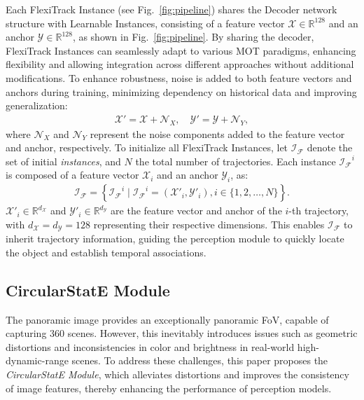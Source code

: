 %

Each FlexiTrack Instance (see Fig.~\ref{fig:pipeline}) shares the Decoder network structure with Learnable Instances, consisting of a feature vector \( \mathcal{X} {\in} \mathbb{R}^{128} \) and an anchor \( \mathcal{Y} {\in} \mathbb{R}^{128} \), as shown in Fig.~\ref{fig:pipeline}. 
By sharing the decoder, FlexiTrack Instances can seamlessly adapt to various MOT paradigms, enhancing flexibility and allowing integration across different approaches without additional modifications.
%
To enhance robustness, noise is added to both feature vectors and anchors during training, minimizing dependency on historical data and improving generalization:
\begin{align}
\mathcal{X}' = \mathcal{X} + \mathcal{N}_X, \quad \mathcal{Y}' = \mathcal{Y} + \mathcal{N}_Y, 
\end{align}
where \( \mathcal{N}_X \) and \( \mathcal{N}_Y \) represent the noise components added to the feature vector and anchor, respectively.
To initialize all FlexiTrack Instances, let \( \mathcal{I_F} \) denote the set of initial \emph{instances}, and \( N \) the total number of trajectories. 
Each instance \( \mathcal{I_F}^i \) is composed of a feature vector \( \mathcal{X}_i \) and an anchor \( \mathcal{Y}_i \), as:
\begin{align}
\mathcal{I_F} = \left\{  \mathcal{I_F} ^i \mid \mathcal{I_F}^i = (\mathcal{X}'_i, \mathcal{Y}'_i), i \in \{1, 2, \dots, N\} \right\}.
\end{align}
%
\( \mathcal{X}'_i {\in} \mathbb{R}^{d_{\mathcal{X}}} \) and \( \mathcal{Y}'_i {\in} \mathbb{R}^{d_{\mathcal{Y}}} \) are the feature vector and anchor of the \( i \)-th trajectory, 
%
with \( d_{\mathcal{X}} {=} d_{\mathcal{Y}} {=} 128 \) representing their respective dimensions.
This enables $\mathcal{I_F}$ to inherit trajectory information, guiding the perception module to quickly locate the object and establish temporal associations.

%


\subsection{CircularStatE Module} 
\label{subsec:CSEM}
%

The panoramic image provides an exceptionally panoramic FoV, capable of capturing 360{\textdegree} scenes. However, this inevitably introduces issues such as geometric distortions and inconsistencies in color and brightness in real-world high-dynamic-range scenes. To address these challenges, this paper proposes the \emph{CircularStatE Module}, which alleviates distortions and improves the consistency of image features, thereby enhancing the performance of perception models.

